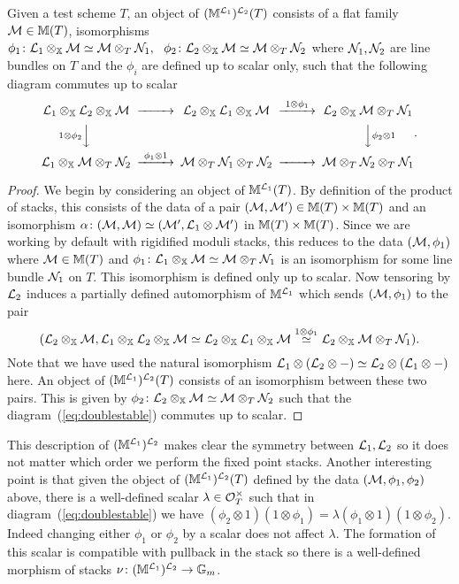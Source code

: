 \documentclass[12pt]{amsart}
\begin{document}
\begin{proposition}  \label{prop:doublestable}
Given a test scheme $T$, an object of $(\mathbb{M}^{\mathcal{L}_1})^{\mathcal{L}_2}(T)$ consists of a flat family $\mathcal{M} \in \mathbb{M}(T)$, isomorphisms $\phi_1 \colon \mathcal{L}_1 \otimes_{\mathbb{X}} \mathcal{M} \simeq \mathcal{M} \otimes_T \mathcal{N}_1, \ \ \phi_2 \colon \mathcal{L}_2 \otimes_{\mathbb{X}} \mathcal{M} \simeq \mathcal{M} \otimes_T \mathcal{N}_2$ where $\mathcal{N}_1, \mathcal{N}_2$ are line bundles on $T$ and the $\phi_i$ are defined up to scalar only, such that the following diagram commutes up to scalar
\begin{equation} \label{eq:doublestable}
\begin{CD}
\cL_1 \otimes_{\bX} \cL_2 \otimes_{\bX} \cM @>>> \cL_2 \otimes_{\bX} \cL_1 \otimes_{\bX} \cM @>{1 \otimes \phi_1}>> \cL_2 \otimes_{\bX} \cM \otimes_T \cN_1 \\
@V{1 \otimes \phi_2}VV @. @VV{\phi_2 \otimes 1}V \\
\cL_1 \otimes_{\bX} \cM \otimes_T \cN_2 @>{\phi_1 \otimes 1}>> \cM \otimes_T \cN_1 \otimes_T \cN_2 @>>> 
\cM \otimes_T \cN_2 \otimes_T \cN_1
\end{CD}.
\end{equation}
\end{proposition}
\begin{proof}
We begin by considering an object of $\mathbb{M}^{\mathcal{L}_1}(T)$. By definition of the product of stacks, this consists of the data of a pair $(\mathcal{M}, \mathcal{M}') \in \mathbb{M}(T) \times\mathbb{M}(T)$ and an isomorphism $\alpha \colon (\mathcal{M}, \mathcal{M}) \simeq (\mathcal{M}', \mathcal{L}_1 \otimes \mathcal{M}')$ in $\mathbb{M}(T) \times \mathbb{M}(T)$. Since we are working by default with rigidified moduli stacks, this reduces to the data $(\mathcal{M}, \phi_1)$ where $\mathcal{M} \in \mathbb{M}(T)$ and $\phi_1 \colon \mathcal{L}_1 \otimes_{\mathbb{X}} \mathcal{M} \simeq \mathcal{M} \otimes_T \mathcal{N}_1$ is an isomorphism for some line bundle $\mathcal{N}_1$ on $T$. This isomorphism is defined only up to scalar. Now tensoring by $\mathcal{L}_2$ induces a partially defined automorphism of $\mathbb{M}^{\mathcal{L}_1}$ which sends $(\mathcal{M},\phi_1)$ to the pair 
$$(\mathcal{L}_2 \otimes_{\mathbb{X}} \mathcal{M}, \mathcal{L}_1 \otimes_{\mathbb{X}} \mathcal{L}_2 \otimes_{\mathbb{X}} \mathcal{M} \simeq \mathcal{L}_2 \otimes_{\mathbb{X}} \mathcal{L}_1 \otimes_{\mathbb{X}} \mathcal{M} \stackrel{1 \otimes \phi_1}{\simeq} \mathcal{L}_2 \otimes_{\mathbb{X}} \mathcal{M} \otimes_T \mathcal{N}_1).$$
Note that we have used the natural isomorphism $\mathcal{L}_1 \otimes (\mathcal{L}_2 \otimes -) \simeq \mathcal{L}_2 \otimes (\mathcal{L}_1 \otimes -)$ here. An object of $(\mathbb{M}^{\mathcal{L}_1})^{\mathcal{L}_2}(T)$ consists of an isomorphism between these two pairs. This is given by $\phi_2 \colon \mathcal{L}_2 \otimes_{\mathbb{X}} \mathcal{M} \simeq \mathcal{M} \otimes_T \mathcal{N}_2$ such that the diagram~(\ref{eq:doublestable}) commutes up to scalar.
\end{proof}
This description of $(\mathbb{M}^{\mathcal{L}_1})^{\mathcal{L}_2}$ makes clear the symmetry between $\mathcal{L}_1, \mathcal{L}_2$ so it does not matter which order we perform the fixed point stacks. Another interesting point is that given the object of $(\mathbb{M}^{\mathcal{L}_1})^{\mathcal{L}_2}(T)$ defined by the data $(\mathcal{M}, \phi_1, \phi_2)$ above, there is a well-defined scalar $\lambda \in \mathcal{O}_T^{\times}$ such that in diagram~(\ref{eq:doublestable}) we have $(\phi_2 \otimes 1) (1 \otimes \phi_1) = \lambda (\phi_1 \otimes 1) (1 \otimes \phi_2)$. Indeed changing either $\phi_1$ or 
$\phi_2$ by a scalar does not affect $\lambda$. The formation of this scalar is compatible with pullback in the stack so there is a well-defined morphism of stacks $\nu \colon (\mathbb{M}^{\mathcal{L}_1})^{\mathcal{L}_2} \rightarrow \mathbb{G}_m$. 
\end{document}
